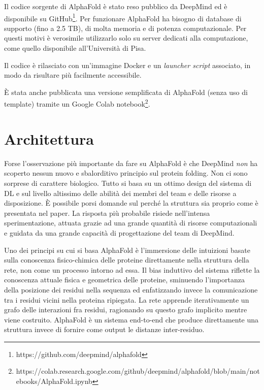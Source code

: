 Il codice sorgente di AlphaFold è stato reso pubblico da DeepMind ed è disponibile su GitHub\footnote{https://github.com/deepmind/alphafold}. Per funzionare AlphaFold ha bisogno di database di supporto (fino a 2.5 TB), di molta memoria e di potenza computazionale. Per questi motivi è verosimile utilizzarlo solo su server dedicati alla computazione, come quello disponibile all'Università di Pisa.

\par Il codice è rilasciato con un'immagine Docker e un \textit{launcher script} associato, in modo da risultare più facilmente accessibile. 

\par È stata anche pubblicata una versione semplificata di AlphaFold (senza uso di template) tramite un Google Colab notebook\footnote{https://colab.research.google.com/github/deepmind/alphafold/blob/main/notebooks/AlphaFold.ipynb}.


\section{Architettura}

Forse l'osservazione più importante da fare su AlphaFold è che DeepMind \textit{non} ha scoperto nessun nuovo e sbalorditivo principio sul protein folding. Non ci sono sorprese di carattere biologico. Tutto si basa su un ottimo design del sistema di DL e sul livello altissimo delle abilità dei membri del team e delle risorse a disposizione. È possibile porsi domande sul perché la struttura sia proprio come è presentata nel paper. La risposta più probabile risiede nell'intensa sperimentazione, attuata grazie ad una grande quantità di risorse computazionali e guidata da una grande capacità di progettazione del team di DeepMind.

\par Uno dei principi su cui si basa AlphaFold è l'immersione delle intuizioni basate sulla conoscenza fisico-chimica delle proteine direttamente nella struttura della rete, non come un processo intorno ad essa. Il bias induttivo del sistema riflette la conoscenza attuale fisica e geometrica delle proteine, sminuendo l'importanza della posizione dei residui nella sequenza ed enfatizzando invece la comunicazione tra i residui vicini nella proteina ripiegata. La rete apprende iterativamente un grafo delle interazioni fra residui, ragionando su questo grafo implicito mentre viene costruito. AlphaFold è un sistema end-to-end che produce direttamente una struttura invece di fornire come output le distanze inter-residuo.

